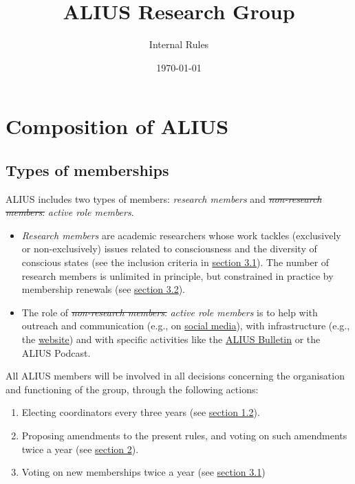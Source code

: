 \documentclass[a4paper, 11pt]{scrartcl}
\begin{document}
\title{\vspace{-2cm} \LARGE ALIUS Research Group}
\subtitle{\Large Internal Rules}
\author{}
\date{\large \today}
\maketitle

\section{Composition of ALIUS}
\subsection{Types of memberships}

ALIUS includes two types of members: \emph{research members} and \sout{\emph{non-research members}.} \emph{active role members}.

\begin{itemize}

\item \emph{Research members} are academic researchers whose work tackles (exclusively or non-exclusively) issues related to consciousness and the diversity of conscious states (see the inclusion criteria in \hyperref[new_memberships]{section 3.1}). The number of research members is unlimited in principle, but constrained in practice by membership renewals (see \hyperref[membership_renewal]{section 3.2}). 

\item The role of \sout{\emph{non-research members}.} \emph{active role members} is to help with outreach and communication (e.g., on \href{https://www.facebook.com/aliusresearch/}{social media}), with infrastructure (e.g., the \href{https://www.aliusresearch.org/}{website}) and with specific activities like the \href{https://www.aliusresearch.org/bulletin.html}{ALIUS Bulletin} or the ALIUS Podcast.


\end{itemize}

\noindent All ALIUS members will be involved in all decisions concerning the organisation and functioning of the group, through the following actions:

\begin{enumerate}
\item Electing coordinators every three years (see \hyperref[coordinators]{section 1.2}).
\item Proposing amendments to the present rules, and voting on such amendments twice a year (see \hyperref[modif]{section 2}).
\item Voting on new memberships twice a year (see \hyperref[new_memberships]{section 3.1})

\end{enumerate}
\end{document}
